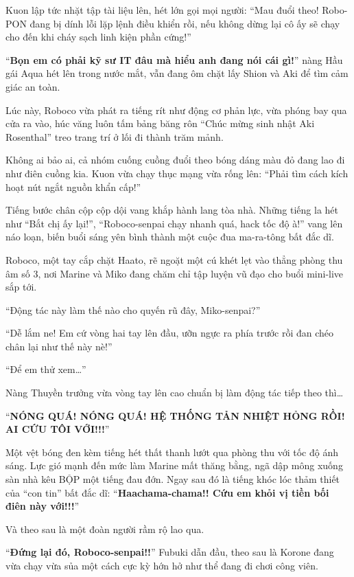 \documentclass[../main.tex]{subfiles}
\begin{document}
Kuon lập tức nhặt tập tài liệu lên, hét lớn gọi mọi người: ``Mau đuổi theo! Robo-PON đang bị dính lỗi lặp lệnh điều khiển  rồi, nếu không dừng lại cô ấy sẽ chạy cho đến khi cháy sạch linh kiện phần cứng!''

``\textbf{Bọn em có phải kỹ sư IT đâu mà hiểu anh đang nói cái gì!}'' nàng Hầu gái Aqua hét lên trong nước mắt, vẫn đang ôm chặt lấy Shion và Aki để tìm cảm giác an toàn.

Lúc này, Roboco vừa phát ra tiếng rít như động cơ phản lực, vừa phóng bay qua cửa ra vào, húc văng luôn tấm bảng băng rôn ``Chúc mừng sinh nhật Aki Rosenthal'' treo trang trí ở lối đi thành trăm mảnh.

Không ai bảo ai, cả nhóm cuống cuồng đuổi theo bóng dáng màu đỏ đang lao đi như điên cuồng kia. Kuon vừa chạy thục mạng vừa rống lên: ``Phải tìm cách kích hoạt nút ngắt nguồn khẩn cấp!''

Tiếng bước chân cộp cộp dội vang khắp hành lang tòa nhà. Những tiếng la hét như ``Bắt chị ấy lại!'', ``Roboco-senpai chạy nhanh quá, hack tốc độ à!'' vang lên náo loạn, biến buổi sáng yên bình thành một cuộc đua ma-ra-tông bất đắc dĩ.

Roboco, một tay cắp chặt Haato, rẽ ngoặt một cú khét lẹt vào thẳng phòng thu âm số 3, nơi Marine và Miko đang chăm chỉ tập luyện vũ đạo cho buổi mini-live sắp tới.

``Động tác này làm thế nào cho quyến rũ đây, Miko-senpai?''

``Dễ lắm ne! Em cứ vòng hai tay lên đầu, ưỡn ngực ra phía trước rồi đan chéo chân lại như thế này nè!''

``Để em thử xem\dots''

Nàng Thuyền trưởng vừa vòng tay lên cao chuẩn bị làm động tác tiếp theo thì\dots

``\textbf{NÓNG QUÁ! NÓNG QUÁ! HỆ THỐNG TẢN NHIỆT HỎNG RỒI! AI CỨU TÔI VỚI!!!}''

Một vệt bóng đen kèm tiếng hét thất thanh lướt qua phòng thu với tốc độ ánh sáng. Lực gió mạnh đến mức làm Marine mất thăng bằng, ngã dập mông xuống sàn nhà kêu BỘP một tiếng đau đớn. Ngay sau đó là tiếng khóc lóc thảm thiết của ``con tin'' bất đắc dĩ: ``\textbf{Haachama-chama!! Cứu em khỏi vị tiền bối điên này với!!!}''

Và theo sau là một đoàn người rầm rộ lao qua.

``\textbf{Đứng lại đó, Roboco-senpai!!}'' Fubuki dẫn đầu, theo sau là Korone đang vừa chạy vừa sủa một cách cực kỳ hớn hở như thể đang đi chơi công viên.
\end{document}
